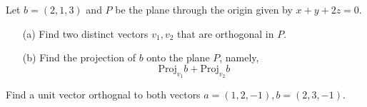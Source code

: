\documentclass[openany]{book}
\begin{document}
\begin{prob}
    Let $b=(2,1,3)$ and $P$ be the plane through the origin given by $x+y+2z=0$. 
    \begin{enumerate}
        \item[(a)] Find two distinct vectors $v_1,v_2$ that are orthogonal in $P$.
        \item[(b)] Find the projection of $b$ onto the plane $P$, namely, 
        \begin{equation*}
            \text{Proj}_{v_1}b+\text{Proj}_{v_2}b
        \end{equation*}
    \end{enumerate}
\end{prob}


\begin{prob}
    Find a unit vector orthognal to both vectors $a=(1,2,-1), b=(2,3,-1)$.
\end{prob}
\end{document}
